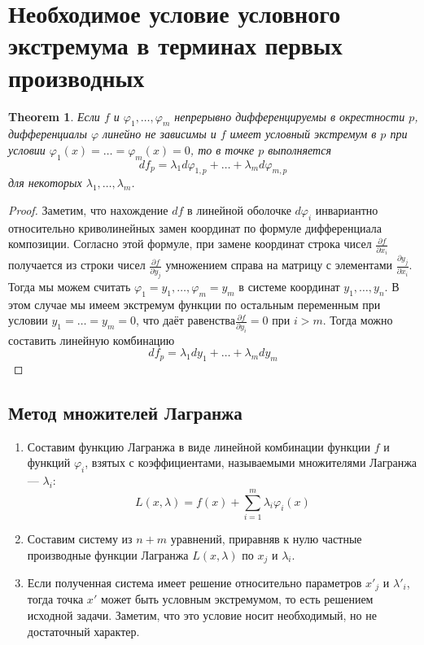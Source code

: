 \documentclass[a4paper,12pt]{article} %
\newtheorem{theorem}{Theorem}
\theoremstyle{definition}
\begin{document}
\section{Необходимое условие условного экстремума в терминах первых производных}
\begin{theorem}
	Если $f$ и $\varphi_1, \dots, \varphi_m$ непрерывно дифференцируемы в окрестности $p$, дифференциалы $\varphi$ линейно не зависимы и $f$ имеет условный экстремум в $p$ при условии $\varphi_1(x) = \dots = \varphi_m(x) = 0$, то в точке $p$ выполняется
	\begin{equation}
		d f_p = \lambda_1 d \varphi_{1, p} + \dots + \lambda_m d \varphi_{m,p} 
	\end{equation}
	для некоторых $\lambda_1, \dots, \lambda_m$.
\end{theorem}
\begin{proof}
	Заметим, что нахождение $df$ в линейной оболочке $d\varphi_i$ инвариантно относительно криволинейных замен координат по формуле дифференциала композиции. Согласно этой формуле, при замене координат строка чисел $\frac{\partial f}{\partial x_i}$ получается из строки чисел $\frac{\partial f}{\partial y_j}$ умножением справа на матрицу с элементами $\frac{\partial y_j}{\partial x_i}$.\\
	Тогда мы можем считать $\varphi_1=y_1,\dots,\varphi_m=y_m$ в системе координат $y_1,\dots,y_n$. В этом случае мы имеем экстремум функции по остальным переменным при условии $y_1= \dots =y_m= 0$, что даёт равенства$\frac{\partial f}{\partial y_i}= 0$ при $i > m$. Тогда можно составить линейную комбинацию
	\begin{equation}
		d f_p = \lambda_1 d y_1 + \dots + \lambda_m d y_m
	\end{equation}
\end{proof}
\subsection{Метод множителей Лагранжа}
\begin{enumerate}
	\item Составим функцию Лагранжа в виде линейной комбинации функции $f $ и функций $\varphi_i$, взятых с коэффициентами, называемыми множителями Лагранжа --- $\lambda_i$:
	\begin{equation}
		L(x, \lambda) = f(x) + \sum_{i = 1}^m \lambda_i \varphi_i(x)
	\end{equation}
	\item Составим систему из $n + m$ уравнений, приравняв к нулю частные производные функции Лагранжа $L(x, \lambda)$ по $x_j$ и $\lambda_i$.
	\item Если полученная система имеет решение относительно параметров $x'_j$ и $\lambda'_i$, тогда точка $x'$ может быть условным экстремумом, то есть решением исходной задачи. Заметим, что это условие носит необходимый, но не достаточный характер.
\end{enumerate}
\end{document}
